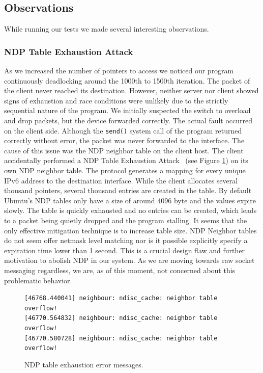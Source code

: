 \subsection{Observations}
While running our tests we made several interesting observations.

\subsubsection{NDP Table Exhaustion Attack}
\label{sec:silly_ndp}
As we increased the number of pointers to access we noticed our program continuously deadlocking around the 1000th to 1500th iteration. The packet of the client never reached its destination. However, neither server nor client showed signs of exhaustion and race conditions were unlikely due to the strictly sequential nature of the program. We initially suspected the switch to overload and drop packets, but the device forwarded correctly. The actual fault occurred on the client side. Although the \texttt{send()} system call of the program returned correctly without error, the packet was never forwarded to the interface. The cause of this issue was the NDP neighbor table on the client host. The client accidentally performed a NDP Table Exhaustion Attack~\cite{RFC3756} (see Figure \ref{lst:ndp_err}) on its own NDP neighbor table. The protocol generates a mapping for every unique IPv6 address to the destination interface. While the client allocates several thousand pointers, several thousand entries are created in the table. By default Ubuntu's NDP tables only have a size of around 4096 byte and the values expire slowly. The table is quickly exhausted and no entries can be created, which leads to a packet being quietly dropped and the program stalling. It seems that the only effective mitigation technique is to increase table size. NDP Neighbor tables do not seem offer netmask level matching nor is it possible explicitly specify a expiration time lower than 1 second. This is a crucial design flaw and further motivation to abolish NDP in our system. As we are moving towards raw socket messaging regardless, we are, as of this moment, not concerned about this problematic behavior.

\begin{figure}
\parbox[b][12px][t]{0.45\textwidth}{
 \footnotesize
 \texttt{[46768.440041] neighbour: ndisc\_cache: neighbor table overflow!}\\
 \texttt{[46770.564832]~neighbour: ndisc\_cache: neighbor table overflow!}\\
 \texttt{[46770.580728] neighbour: ndisc\_cache: neighbor table overflow!}
 } 
\caption{NDP table exhaustion error messages.}
\label{lst:ndp_err}
\end{figure}
